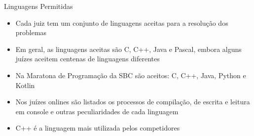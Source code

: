 \begin{frame}[fragile]{Linguagens Permitidas}

    \begin{itemize}
        \item  Cada  juiz tem um conjunto de linguagens aceitas para a resolução dos problemas
        \item Em geral, as linguagens aceitas são C, C++, Java e Pascal, embora alguns juízes aceitem centenas de linguagens diferentes
        \item Na Maratona de Programação da SBC são aceitos: C, C++, Java, Python e Kotlin
        \item Nos juízes onlines são listados os processos de compilação, de escrita e leitura em
        console e outras peculiaridades de cada linguagem
        \item C++ é a linguagem mais utilizada pelos competidores
    \end{itemize}

\end{frame}
